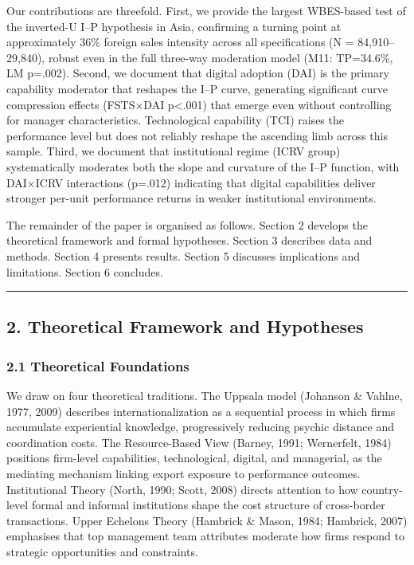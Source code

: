 \documentclass[12pt,a4paper]{article}
\begin{document}
Our contributions are threefold. First, we provide the largest
WBES-based test of the inverted-U I--P hypothesis in Asia, confirming a
turning point at approximately 36\% foreign sales intensity across all
specifications (N = 84,910--29,840), robust even in the full three-way
moderation model (M11: TP=34.6\%, LM p=.002). Second, we document that
digital adoption (DAI) is the primary capability moderator that reshapes
the I--P curve, generating significant curve compression effects
(FSTS×DAI p\textless.001) that emerge even without controlling for
manager characteristics. Technological capability (TCI) raises the
performance level but does not reliably reshape the ascending limb
across this sample. Third, we document that institutional regime (ICRV
group) systematically moderates both the slope and curvature of the I--P
function, with DAI×ICRV interactions (p=.012) indicating that digital
capabilities deliver stronger per-unit performance returns in weaker
institutional environments.

The remainder of the paper is organised as follows. Section 2 develops
the theoretical framework and formal hypotheses. Section 3 describes
data and methods. Section 4 presents results. Section 5 discusses
implications and limitations. Section 6 concludes.

\begin{center}\rule{0.5\linewidth}{0.5pt}\end{center}

\hypertarget{2-theoretical-framework-and-hypotheses}{%
\subsection{2. Theoretical Framework and
Hypotheses}\label{2-theoretical-framework-and-hypotheses}}

\hypertarget{21-theoretical-foundations}{%
\subsubsection{2.1 Theoretical
Foundations}\label{21-theoretical-foundations}}

We draw on four theoretical traditions. The Uppsala model (Johanson \&
Vahlne, 1977, 2009) describes internationalization as a sequential
process in which firms accumulate experiential knowledge, progressively
reducing psychic distance and coordination costs. The Resource-Based
View (Barney, 1991; Wernerfelt, 1984) positions firm-level capabilities,
technological, digital, and managerial, as the mediating mechanism
linking export exposure to performance outcomes. Institutional Theory
(North, 1990; Scott, 2008) directs attention to how country-level formal
and informal institutions shape the cost structure of cross-border
transactions. Upper Echelons Theory (Hambrick \& Mason, 1984; Hambrick,
2007) emphasises that top management team attributes moderate how firms
respond to strategic opportunities and constraints.
\end{document}
